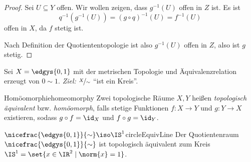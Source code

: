 \documentclass[language=ngerman]{TemplateLecture} %
\begin{document}
\begin{proof}
    Sei $U \subseteq Y$ offen. Wir wollen zeigen, dass $g^{-1}(U)$ offen in $Z$ ist. Es ist
    \begin{equation*}
        q^{-1}(g^{-1}(U)) = (g \circ q)^{-1}(U) = f^{-1}(U)
    \end{equation*}
    offen in $X$, da $f$ stetig ist. 

    Nach Definition der Quotiententopologie ist also $g^{-1}(U)$ offen in $Z$, also ist $g$ stetig.
\end{proof}

\begin{example}
    Sei $X = \edgys{0,1}$ mit der metrischen Topologie und Äquivalenzrelation erzeugt von $0 \sim 1$. \emph{Ziel:} $\nicefrac{X}{\sim}$ \enquote{ist ein Kreis}.
\end{example}

\begin{defi}{Homöomorphie}{homeomorphy}
    Zwei topologische Räume $X, Y$ heißen \emph{topologisch äquivalent} bzw. \emph{homöomorph}, falls stetige Funktionen $f: X \to Y$ und $g: Y \to X$ existieren, sodass $g \circ f = \id_X$ und $f \circ g = \id_Y$.
\end{defi}

\begin{thm}{$\nicefrac{\edgys{0,1}}{\sim} \iso \IS^1$}{circleEquivLine}
    Der Quotientenraum $\nicefrac{\edgys{0,1}}{\sim}$ ist topologisch äquivalent zum Kreis $\IS^1 = \set{x \in \IR^2 \mid \norm{x} = 1}$.
\end{thm}
\end{document}
